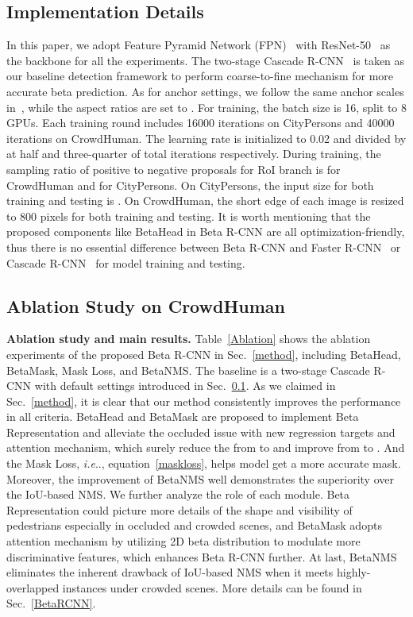 \documentclass{article}
\makeatletter
\DeclareRobustCommand\onedot{\futurelet\@let@token\@onedot}
\def\@onedot{\ifx\@let@token.\else.\null\fi\xspace}
\def\ie{\emph{i.e}\onedot} \def\Ie{\emph{I.e}\onedot}
\makeatother
\begin{document}
\subsection{Implementation Details}
\label{implementation}
In this paper, we adopt Feature Pyramid Network (FPN)~\cite{fpn} with ResNet-50~\cite{resnet} as the backbone for all the experiments. 
The two-stage Cascade R-CNN~\cite{cascadercnn} is taken as our baseline detection framework to perform coarse-to-fine mechanism for more accurate beta prediction. 
As for anchor settings, we follow the same anchor scales in~\cite{fpn}, while the aspect ratios are set to .
For training, the batch size is 16, split to 8 GPUs.
Each training round includes 16000 iterations on CityPersons and 40000 iterations on CrowdHuman.
The learning rate is initialized to 0.02 and divided by  at half and three-quarter of total iterations respectively.
During training, the sampling ratio of positive to negative proposals for RoI branch is  for CrowdHuman and  for CityPersons.
On CityPersons, the input size for both training and testing is .
On CrowdHuman, the short edge of each image is resized to 800 pixels for both training and testing. 
It is worth mentioning that the proposed components like BetaHead in Beta R-CNN are all optimization-friendly, thus there is no essential difference between Beta R-CNN and Faster R-CNN~\cite{faster} or Cascade R-CNN~\cite{cascadercnn} for model training and testing.


\subsection{Ablation Study on CrowdHuman}
\textbf{Ablation study and main results.}
Table~\ref{Ablation} shows the ablation experiments of the proposed Beta R-CNN in Sec.~\ref{method}, including BetaHead, BetaMask, Mask Loss, and BetaNMS.
The baseline is a two-stage Cascade R-CNN with default settings introduced in Sec.~\ref{implementation}.
As we claimed in Sec.~\ref{method}, it is clear that our method consistently improves the performance in all criteria.
BetaHead and BetaMask are proposed to implement Beta Representation and alleviate the occluded issue with new regression targets and attention mechanism, which surely reduce the  from  to  and improve  from  to .
And the Mask Loss, \ie, equation~\ref{maskloss}, helps model get a more accurate mask.
Moreover, the improvement of BetaNMS well demonstrates the superiority over the IoU-based NMS.
We further analyze the role of each module. Beta Representation could picture more details of the shape and visibility of pedestrians especially in occluded and crowded scenes, and BetaMask adopts attention mechanism by utilizing 2D beta distribution to modulate more discriminative features, which enhances Beta R-CNN further. At last, BetaNMS eliminates the inherent drawback of IoU-based NMS when it meets highly-overlapped instances under crowded scenes. More details can be found in Sec.~\ref{BetaRCNN}.
\end{document}
